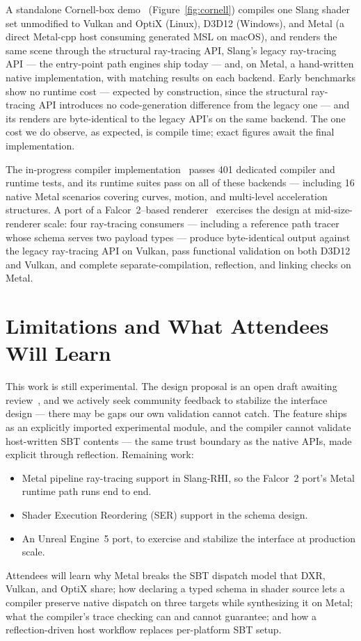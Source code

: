\documentclass[sigconf,nonacm]{acmart}
\begin{document}
A standalone Cornell-box demo~\cite{rt-cornell-demo}
(Figure~\ref{fig:cornell}) compiles one
Slang shader set unmodified to Vulkan and OptiX (Linux), D3D12
(Windows), and Metal (a direct Metal-cpp host consuming generated MSL
on macOS), and renders the same scene through the structural
ray-tracing API, Slang's legacy ray-tracing API --- the entry-point
path engines ship today --- and, on Metal, a hand-written native
implementation, with matching results on each backend. Early benchmarks
show no runtime cost --- expected by construction, since the structural
ray-tracing API introduces no code-generation difference from the
legacy one --- and its renders are byte-identical to the legacy API's
on the same backend. The one cost we do observe, as expected, is
compile time; exact figures await the final implementation.

The in-progress compiler implementation~\cite{rt-implementation} passes
401 dedicated compiler and runtime tests, and its runtime
suites pass on all of these backends --- including 16 native Metal
scenarios covering curves, motion, and multi-level acceleration
structures. A port of a Falcor~2--based
renderer~\cite{rt-falcor2-port} exercises
the design at mid-size-renderer scale: four ray-tracing consumers ---
including a reference path tracer whose schema serves two payload types
--- produce byte-identical output against the legacy ray-tracing API on
Vulkan, pass functional validation on both D3D12 and Vulkan, and
complete separate-compilation, reflection, and linking checks on
Metal.

\section{Limitations and What Attendees Will Learn}

This work is still experimental. The design proposal is an open draft
awaiting review~\cite{rt-proposal},
and we actively seek community feedback to stabilize the interface
design --- there may be gaps our own validation cannot catch. The
feature ships as an explicitly imported experimental module, and the
compiler cannot validate host-written SBT contents --- the same trust
boundary as the native APIs, made explicit through reflection.
Remaining work:

\begin{itemize}
\item Metal pipeline ray-tracing support in Slang-RHI, so the
  Falcor~2 port's Metal runtime path runs end to end.
\item Shader Execution Reordering (SER) support in the schema design.
\item An Unreal Engine~5 port, to exercise and stabilize the interface
  at production scale.
\end{itemize}

Attendees will learn why Metal breaks the SBT dispatch model that DXR,
Vulkan, and OptiX share; how declaring a typed schema in shader source
lets a compiler preserve native dispatch on three targets while
synthesizing it on Metal; what the compiler's trace checking can
and cannot guarantee; and how a reflection-driven host workflow replaces
per-platform SBT setup.



\end{document}
